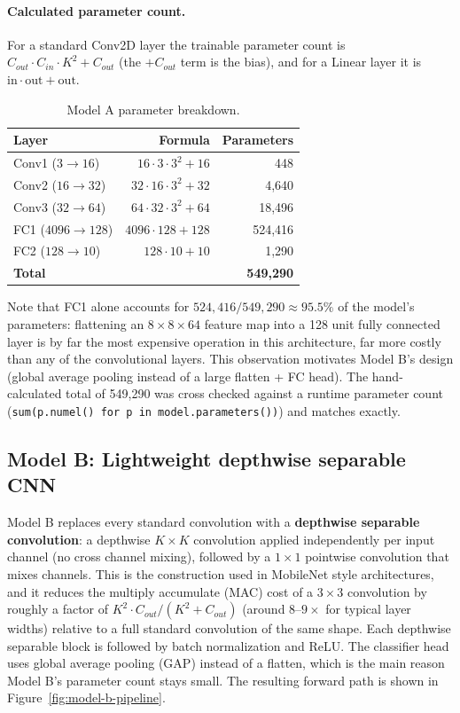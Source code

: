 \documentclass[11pt]{article}
\begin{document}
\paragraph{Calculated parameter count.} For a standard Conv2D layer the
trainable parameter count is $C_{out} \cdot C_{in} \cdot K^2 + C_{out}$ (the
$+C_{out}$ term is the bias), and for a Linear layer it is
$\text{in} \cdot \text{out} + \text{out}$.

\begin{table}[H]
\centering
\caption{Model A parameter breakdown.}
\label{tab:model-a-params}
\begin{tabular}{lrr}
\toprule
Layer & Formula & Parameters \\
\midrule
Conv1 ($3 \rightarrow 16$) & $16 \cdot 3 \cdot 3^2 + 16$ & 448 \\
Conv2 ($16 \rightarrow 32$) & $32 \cdot 16 \cdot 3^2 + 32$ & 4{,}640 \\
Conv3 ($32 \rightarrow 64$) & $64 \cdot 32 \cdot 3^2 + 64$ & 18{,}496 \\
FC1 ($4096 \rightarrow 128$) & $4096 \cdot 128 + 128$ & 524{,}416 \\
FC2 ($128 \rightarrow 10$) & $128 \cdot 10 + 10$ & 1{,}290 \\
\midrule
\textbf{Total} & & \textbf{549{,}290} \\
\bottomrule
\end{tabular}
\end{table}

Note that FC1 alone accounts for $524{,}416 / 549{,}290 \approx 95.5\%$ of
the model's parameters: flattening an $8\times8\times64$ feature map into a
128 unit fully connected layer is by far the most expensive operation in
this architecture, far more costly than any of the convolutional layers.
This observation motivates Model B's design (global average pooling instead
of a large flatten + FC head). The hand-calculated total of 549{,}290 was
cross checked against a runtime parameter count
(\texttt{sum(p.numel() for p in model.parameters())}) and matches exactly.

\subsection{Model B: Lightweight depthwise separable CNN}

Model B replaces every standard convolution with a \textbf{depthwise
separable convolution}: a depthwise $K \times K$ convolution applied
independently per input channel (no cross channel mixing), followed by a
$1\times1$ pointwise convolution that mixes channels. This is the
construction used in MobileNet style architectures, and it reduces the
multiply accumulate (MAC) cost of a $3\times3$ convolution by roughly a
factor of $K^2 \cdot C_{out} / (K^2 + C_{out})$ (around $8$--$9\times$ for
typical layer widths) relative to a full standard convolution of the same
shape. Each depthwise separable block is followed by batch normalization and
ReLU. The classifier head uses global average pooling (GAP) instead of a
flatten, which is the main reason Model B's parameter count stays small.
The resulting forward path is shown in Figure~\ref{fig:model-b-pipeline}.
\end{document}

